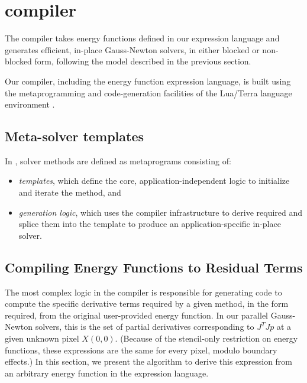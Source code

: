 \section{compiler}
\label{sec:compiler}


The \OPT compiler takes energy functions defined in our expression language and generates efficient, in-place Gauss-Newton solvers, in either blocked or non-blocked form, following the model described in the previous section.

Our compiler, including the energy function expression language, is built using the metaprogramming and code-generation facilities of the Lua/Terra language environment \cite{terra}.

\subsection{Meta-solver templates} %
\label{sub:solver_templates}
In \OPT, solver methods are defined as metaprograms consisting of:

\begin{itemize}
  \item \emph{templates}, which define the core, application-independent logic to initialize and iterate the method, and
  \item \emph{generation logic}, which uses the compiler infrastructure to derive required and splice them into the template to produce an application-specific in-place solver.
\end{itemize}


\subsection{Compiling Energy Functions to Residual Terms} %
\label{sec:jtj_generation}

The most complex logic in the compiler is responsible for generating code to compute the specific derivative terms required by a given method, in the form required, from the original user-provided energy function.
In our parallel Gauss-Newton solvers, this is the set of partial derivatives corresponding to $J^TJp$ at a given unknown pixel $X(0,0)$. (Because of the stencil-only restriction on energy functions, these expressions are the same for every pixel, modulo boundary effects.)
In this section, we present the algorithm to derive this expression from an arbitrary energy function in the \OPT expression language.


